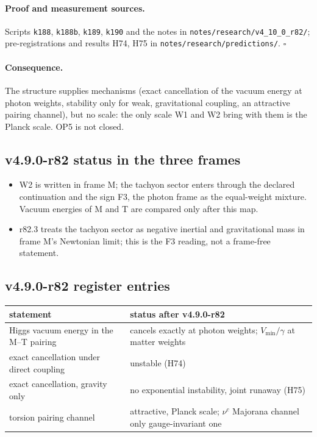 \paragraph{Proof and measurement sources.}
Scripts \texttt{k188}, \texttt{k188b}, \texttt{k189}, \texttt{k190} and the notes in \texttt{notes/\allowbreak research/\allowbreak v4\_10\_0\_r82/};
pre-registrations and results H74, H75 in \texttt{notes/\allowbreak research/\allowbreak predictions/}.  \(\square\)

\paragraph{Consequence.}
The structure supplies mechanisms (exact cancellation of the vacuum energy at photon weights, stability only for weak, gravitational
coupling, an attractive pairing channel), but no scale: the only scale W1 and W2 bring with them is the Planck scale.  OP5 is not
closed.

\subsection*{v4.9.0-r82 status in the three frames}
\label{subsec:v490-r82-frames}

\begin{itemize}[leftmargin=2em]
\item W2 is written in frame M; the tachyon sector enters through the declared continuation and the sign F3, the photon frame as the
equal-weight mixture.  Vacuum energies of M and T are compared only after this map.
\item r82.3 treats the tachyon sector as negative inertial and gravitational mass in frame M's Newtonian limit; this is the F3 reading,
not a frame-free statement.
\end{itemize}

\subsection*{v4.9.0-r82 register entries}
\label{subsec:v490-r82-register}

\begin{center}
\small
\begin{tabular}{@{}>{\raggedright\arraybackslash}p{}>{\raggedright\arraybackslash}p{}@{}}
\toprule
statement & status after v4.9.0-r82\\
\midrule
Higgs vacuum energy in the M--T pairing & cancels exactly at photon weights; \(V_{\min}/\gamma\) at matter weights\\
exact cancellation under direct coupling & unstable (H74)\\
exact cancellation, gravity only & no exponential instability, joint runaway (H75)\\
torsion pairing channel & attractive, Planck scale; \(\nu^c\) Majorana channel only gauge-invariant one\\
\bottomrule
\end{tabular}
\end{center}


